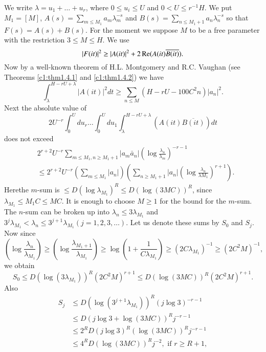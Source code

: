 \medskip
{}

We write $\lambda = u_1 + \ldots + u_r$, where $0 \leq u_i \leq U$ and $0 < U \leq r^{-1} H$. We put $M_1 = [M]$, $A(s) = \sum\limits_{m \leq M_1} a_m \lambda^{-s}_m$ and $B(s) = \sum\limits_{n \leq M_1 + 1} a_n\lambda^{-s}_n$ so that $F(s) = A(s) + B(s)$. For the moment we suppose $M$ to be a free parameter with the restriction $3 \leq M \leq H$. We use
$$
|F(it)|^2 \geq |A(it)|^2 + 2 \operatorname{Re} (A (it) \overline{B(it)}).
$$
Now by a well-known theorem of H.L. Montgomery  and R.C. Vaughan (see Theorems \ref{c1:thm1.4.1} and \ref{c1:thm1.4.2}) we have
$$
\int^{H-rU+\lambda}_\lambda |A(it)|^2 dt \geq \sum\limits_{n\leq M} (H-rU - 100 C^2 n) |a_n|^2. 
$$
Next the absolute value of 
\begin{equation*}
2 U^{-r}\int^U_0 du_r \ldots \int^U_0 du_1 \int^{H-r U+\lambda}_\lambda (A(it) \overline{B(it)}) dt \tag{3.4A.1}\label{c3:eq3.4A.1}
\end{equation*}
does not exceed
\begin{align*}
& 2^{r+2} U^{-r} \sum\limits_{m \leq M_1, n \geq M_1 + 1} |a_m
  \bar{a}_n| \left(\log \frac{\lambda_n}{\lambda_m} \right)^{-r-1}\\ 
& \leq 2^{r+2} U^{-r} \left( \sum\limits_{m\leq M_1} |a_n|\right)
  \left( \sum\limits_{n\geq M_1 +1} |a_n| \left(\log
  \frac{\lambda_n}{\lambda M_1} \right)^{r+1}\right). 
 \end{align*}
Here\pageoriginale the $m$-sum is $\leq D (\log\lambda_{M_1})^R \leq D
(\log (3MC))^R$, since $\lambda_{M_1} \leq M_1 C \leq MC$. It is
enough to choose $M \geq 1$ for the bound for the $m$-sum. The $n$-sum
can be broken up into $\lambda_n \leq 3 \lambda_{M_1}$ and $3^j
\lambda_{M_1} < \lambda_n \leq 3^{j+1} \lambda_{M_1} (j=
1,2,3,\ldots)$. Let us denote these sums by $S_0$ and $S_j$. 
Now since 
$$\left(\log \frac{\lambda_n}{\lambda_{M_1}} \right) \geq \left(\log
\frac{\lambda_{M_1+1}}{\lambda_{M_1}} \right) \geq \log
\left(1+\frac{1}{C\lambda_{M_1}} \right) \geq (2C\lambda_{M_1})^{-1}
\geq (2C^2 M)^{-1},$$ 
we obtain
$$
S_0 \leq D(\log (3\lambda_{M_1}))^R (2C^2 M)^{r+1} \leq D (\log (3MC))^R (2C^2 M)^{r+1}.
$$
Also 
\begin{align*}
S_j & \leq D (\log (3^{j+1} \lambda_{M_1}))^R (j \log 3)^{-r-1}\\
& \leq D (j \log 3 + \log (3 MC))^R j^{-r-1}\\
& \leq 2^R D(j \log 3)^R (\log (3 MC))^{R} j^{-r-1}\\
& \leq 4^R D (\log (3 MC))^R j^{-2}, \text{ if } r \geq R + 1,
\end{align*}
